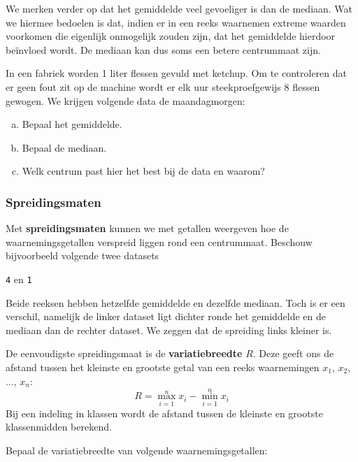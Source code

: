 \documentclass[12pt,twoside,a4paper]{article}
\begin{document}
We merken verder op dat het gemiddelde veel gevoeliger is dan de mediaan. Wat we hiermee bedoelen is dat, indien er in een reeks waarnemen extreme waarden voorkomen die eigenlijk onmogelijk zouden zijn, dat het gemiddelde hierdoor beïnvloed wordt. De mediaan kan dus soms een betere centrummaat zijn.

\begin{oefening}
In een fabriek worden 1 liter flessen gevuld met ketchup. Om te controleren dat er geen fout zit op de machine wordt er elk uur steekproefgewijs 8 flessen gewogen. We krijgen volgende data de maandagmorgen:
\begin{center}
\end{center}
\begin{enumerate}[(a)]
  \item Bepaal het gemiddelde.
  \item Bepaal de mediaan.
  \item Welk centrum past hier het best bij de data en waarom?
\end{enumerate}
\end{oefening}

\subsubsection{Spreidingsmaten}

Met {\bf spreidingsmaten} kunnen we met getallen weergeven hoe de waarnemingsgetallen verspreid liggen rond een centrummaat. Beschouw bijvoorbeeld volgende twee datasets
\begin{center}
  \texttt{4} \qquad\qquad en \qquad\qquad \texttt{1}
\end{center}
Beide reeksen hebben hetzelfde gemiddelde en dezelfde mediaan. Toch is er een verschil, namelijk de linker dataset ligt dichter ronde het gemiddelde en de mediaan dan de rechter dataset. We zeggen dat de spreiding links kleiner is.

De eenvoudigste spreidingsmaat is de {\bf variatiebreedte} $R$. Deze geeft ons de afstand tussen het kleinste en grootste getal van een reeks waarnemingen $x_1$, $x_2$, $\ldots$, $x_n$:
$$R=\max_{i=1}^n x_i - \min_{i=1}^n x_i $$
Bij een indeling in klassen wordt de afstand tussen de kleinste en grootste klassenmidden berekend.

\begin{oefening}
Bepaal de variatiebreedte van volgende waarnemingsgetallen:
\begin{center}
\end{center}
\end{oefening}
\end{document}
